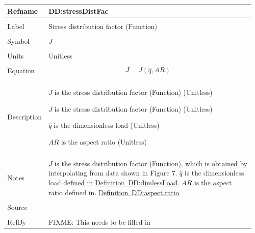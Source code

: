 \documentclass[12pt]{article}
\begin{document}
\noindent \begin{minipage}{\textwidth}
\begin{tabular}{p{} p{}}
\toprule \textbf{Refname} & \textbf{DD:stressDistFac}
\label{DD:stressDistFac}
\\ \midrule \\
Label & Stress distribution factor (Function)
\\ \midrule \\
Symbol & $J$
\\ \midrule \\
Units & Unitless
\\ \midrule \\
Equation & \begin{dmath}
           J=J\left(\hat{q},AR\right)
           \end{dmath}
\\ \midrule \\
Description & \begin{symbDescription}
              \item{$J$ is the stress distribution factor (Function) (Unitless)}
              \item{$J$ is the stress distribution factor (Function) (Unitless)}
              \item{$\hat{q}$ is the dimensionless load (Unitless)}
              \item{$AR$ is the aspect ratio (Unitless)}
              \end{symbDescription}
\\ \midrule \\
Notes & $J$ is the stress distribution factor (Function), which is obtained by interpolating from data shown in Figure 7.
        $\hat{q}$ is the dimensionless load defined in \hyperref[DD:dimlessLoad]{Definition~DD:dimlessLoad}.
        $AR$ is the aspect ratio defined in. \hyperref[DD:aspect.ratio]{Definition~DD:aspect.ratio}
\\ \midrule \\
Source & 
\\ \midrule \\
RefBy & FIXME: This needs to be filled in
\\ \bottomrule \end{tabular}
\end{minipage}\\
~\newline
\end{document}
